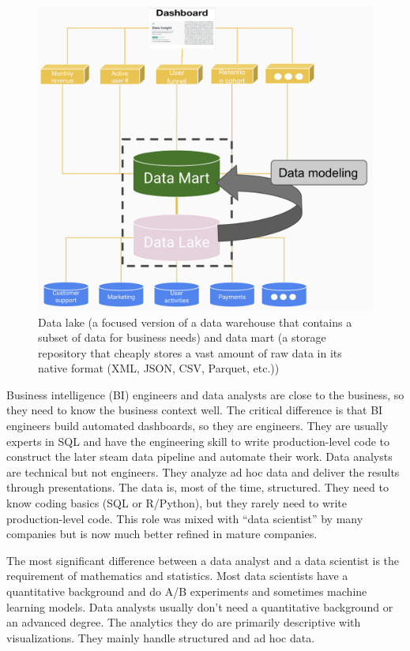\documentclass[
  12pt,
]{krantz}
\begin{document}
\begin{figure}

{\centering \includegraphics[width=1\linewidth]{images/databases} 

}

\caption{Data lake (a focused version of a data warehouse that contains a subset of data for business needs) and data mart (a storage repository that cheaply stores a vast amount of raw data in its native format (XML, JSON, CSV, Parquet, etc.))}\label{fig:databases}
\end{figure}

Business intelligence (BI) engineers and data analysts are close to the business, so they need to know the business context well. The critical difference is that BI engineers build automated dashboards, so they are engineers. They are usually experts in SQL and have the engineering skill to write production-level code to construct the later steam data pipeline and automate their work. Data analysts are technical but not engineers. They analyze ad hoc data and deliver the results through presentations. The data is, most of the time, structured. They need to know coding basics (SQL or R/Python), but they rarely need to write production-level code. This role was mixed with ``data scientist'' by many companies but is now much better refined in mature companies.

The most significant difference between a data analyst and a data scientist is the requirement of mathematics and statistics. Most data scientists have a quantitative background and do A/B experiments and sometimes machine learning models. Data analysts usually don't need a quantitative background or an advanced degree. The analytics they do are primarily descriptive with visualizations. They mainly handle structured and ad hoc data.
\end{document}
